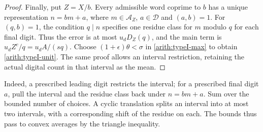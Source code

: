 \documentclass[11pt,a4paper]{article}
\theoremstyle{paperplain}
\numberwithin{equation}{section}
\begin{document}
\begin{proof}
Finally, put $Z=X/b$. Every admissible word coprime to $b$ has a unique
representation $n=bm+a$, where $m\in\mathcal A_Z$, $a\in\mathcal D$ and
$(a,b)=1$. For $(q,b)=1$, the condition $q\mid n$ specifies one residue
class for $m$ modulo $q$ for each final digit.
Thus the error is at most $u_dD_Z(q)$, and the main term is
$u_dZ^c/q=u_dA/(sq)$.
Choose $(1+\epsilon)\theta<\sigma$ in \eqref{arith:typeI-max} to obtain
\eqref{arith:typeI-unit}. The same proof allows an interval restriction,
retaining the actual digital count in that interval as the mean.
\end{proof}

Indeed, a prescribed leading digit restricts the interval; for a
prescribed final digit $a$, pull the interval and the residue class
back under $n=bm+a$. Sum over the bounded number of choices. A
cyclic translation splits an interval into at most two intervals,
with a corresponding shift of the residue on each. The bounds thus
pass to convex averages by the triangle inequality.
\end{document}
